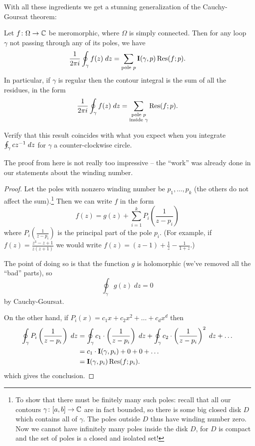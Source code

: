 With all these ingredients we get a stunning generalization of the Cauchy-Goursat theorem:
\begin{theorem}
	Let $f \colon \Omega \to \mathbb C$ be meromorphic, where $\Omega$ is simply connected.
	Then for any loop $\gamma$ not passing through any of its poles, we have
	\[
		\frac{1}{2\pi i} \oint_{\gamma} f(z) \; dz
		= \sum_{\text{pole $p$}} \operatorname{\mathbf I}(\gamma, p) \operatorname{Res}(f; p).
	\]
	In particular, if $\gamma$ is regular then the contour integral
	is the sum of all the residues, in the form
	\[
		\frac{1}{2\pi i} \oint_{\gamma} f(z) \; dz
		= \sum_{\substack{\text{pole $p$} \\ \text{inside $\gamma$}}}  \operatorname{Res}(f; p).
	\]
\end{theorem}
\begin{ques}
	Verify that this result coincides
	with what you expect when you integrate $\oint_\gamma cz^{-1} \; dz$
	for $\gamma$ a counter-clockwise circle.
\end{ques}

The proof from here is not really too impressive -- the ``work'' was already
done in our statements about the winding number.
\begin{proof}
	Let the poles with nonzero winding number be $p_1, \dots, p_k$
	(the others do not affect the sum).\footnote{To show
		that there must be finitely many such poles: recall that all our contours $\gamma \colon [a,b] \to \mathbb C$
		are in fact bounded, so there is some big closed disk $D$ which contains all of $\gamma$.
		The poles outside $D$ thus have winding number zero.
		Now we cannot have infinitely many poles inside the disk $D$, for $D$ is compact and the
		set of poles is a closed and isolated set!}
	Then we can write $f$ in the form
	\[
		f(z) = g(z) + \sum_{i=1}^k P_i\left( \frac{1}{z-p_i} \right)
	\]
	where $P_i\left( \frac{1}{z-p_i} \right)$ is the principal part of the pole $p_i$.
	(For example, if $f(z) = \frac{z^3-z+1}{z(z+1)}$ we would write $f(z) = (z-1) + \frac1z - \frac1{1+z}$.)

	The point of doing so is that the function $g$ is holomorphic (we've removed all the ``bad'' parts), so
	\[ \oint_{\gamma} g(z) \; dz = 0 \]
	by Cauchy-Goursat.

	On the other hand, if $P_i(x) = c_1x + c_2x^2 + \dots + c_d x^d$ then
	\begin{align*}
		\oint_{\gamma} P_i\left( \frac{1}{z-p_i} \right) \; dz
		&=
		\oint_{\gamma} c_1 \cdot \left( \frac{1}{z-p_i} \right) \; dz
		+ \oint_{\gamma} c_2 \cdot \left( \frac{1}{z-p_i} \right)^2 \; dz
		+ \dots \\
		&= c_1 \cdot \operatorname{\mathbf I}(\gamma, p_i) + 0 + 0 + \dots \\
		&= \operatorname{\mathbf I}(\gamma, p_i) \operatorname{Res}(f; p_i).
	\end{align*}
	which gives the conclusion.
\end{proof}

